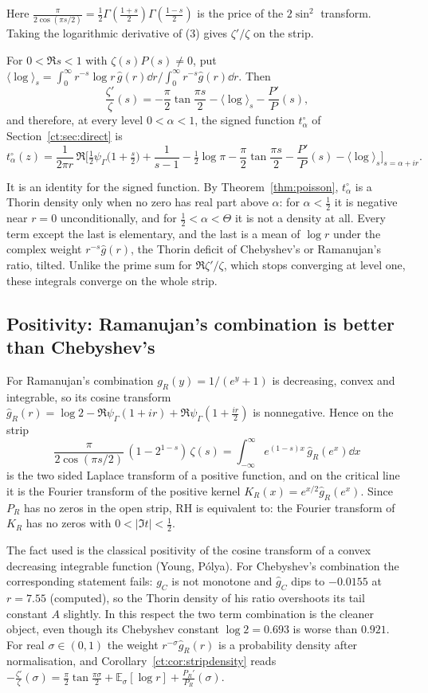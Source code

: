 Here $\frac\pi{2\cos(\pi s/2)}=\frac12\Gamma(\frac{1+s}2)\Gamma(\frac{1-s}2)$ is the price of the $2\sin^2$ transform. Taking the logarithmic derivative of (3) gives $\zeta'/\zeta$ on the strip.
\begin{corollary}\label{ct:cor:stripdensity}
For $0<\Re s<1$ with $\zeta(s)P(s)\ne0$, put $\langle\log\rangle_s=\int_0^\infty r^{-s}\log r\,\hat g(r)\dd r\Big/\int_0^\infty r^{-s}\hat g(r)\dd r$. Then
\[
\frac{\zeta'}{\zeta}(s)=-\frac\pi2\tan\frac{\pi s}2-\langle\log\rangle_s-\frac{P'}{P}(s),
\]
and therefore, at every level $0<\alpha<1$, the signed function $t^\circ_\alpha$ of Section~\ref{ct:sec:direct} is
\[
t^\circ_\alpha(z)=\frac1{2\pi r}\,\Re\Big[\tfrac12\psi_\Gamma\big(1+\tfrac s2\big)+\frac1{s-1}-\tfrac12\log\pi-\frac\pi2\tan\frac{\pi s}2-\frac{P'}{P}(s)-\langle\log\rangle_s\Big]_{s=\alpha+ir}.
\]
\end{corollary}
It is an identity for the signed function. By Theorem~\ref{thm:poisson}, $t^\circ_\alpha$ is a Thorin density only when no zero has real part above $\alpha$: for $\alpha<\frac12$ it is negative near $r=0$ unconditionally, and for $\frac12<\alpha<\Theta$ it is not a density at all. Every term except the last is elementary, and the last is a mean of $\log r$ under the complex weight $r^{-s}\hat g(r)$, the Thorin deficit of Chebyshev's or Ramanujan's ratio, tilted. Unlike the prime sum for $\Re\zeta'/\zeta$, which stops converging at level one, these integrals converge on the whole strip.

\subsection{Positivity: Ramanujan's combination is better than Chebyshev's}
\begin{proposition}\label{ct:prop:polya}
For Ramanujan's combination $g_R(y)=1/(e^y+1)$ is decreasing, convex and integrable, so its cosine transform $\hat g_R(r)=\log2-\Re\psi_\Gamma(1+ir)+\Re\psi_\Gamma(1+\frac{ir}2)$ is nonnegative. Hence on the strip
\[
\frac{\pi}{2\cos(\pi s/2)}\,(1-2^{1-s})\,\zeta(s)=\int_{-\infty}^\infty e^{(1-s)x}\,\hat g_R(e^x)\dd x
\]
is the two sided Laplace transform of a positive function, and on the critical line it is the Fourier transform of the positive kernel $K_R(x)=e^{x/2}\hat g_R(e^x)$. Since $P_R$ has no zeros in the open strip, RH is equivalent to: the Fourier transform of $K_R$ has no zeros with $0<|\Im t|<\frac12$.
\end{proposition}
The fact used is the classical positivity of the cosine transform of a convex decreasing integrable function (Young, P\'olya). For Chebyshev's combination the corresponding statement fails: $g_C$ is not monotone and $\hat g_C$ dips to $-0.0155$ at $r=7.55$ (computed), so the Thorin density of his ratio overshoots its tail constant $A$ slightly. In this respect the two term combination is the cleaner object, even though its Chebyshev constant $\log2=0.693$ is worse than $0.921$. For real $\sigma\in(0,1)$ the weight $r^{-\sigma}\hat g_R(r)$ is a probability density after normalisation, and Corollary~\ref{ct:cor:stripdensity} reads $-\frac{\zeta'}{\zeta}(\sigma)=\frac\pi2\tan\frac{\pi\sigma}2+\mathbb E_\sigma[\log r]+\frac{P_R'}{P_R}(\sigma)$.

